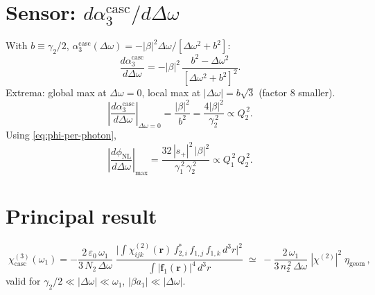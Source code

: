 \documentclass[11pt,a4paper]{article}
\newcommand{\eps}{\varepsilon}
\newcommand{\bvec}[1]{\mathbf{#1}}
\newcommand{\f}{\bvec{f}}
\newcommand{\ri}{\bvec{r}}
\newcommand{\dthreer}{\,d^{3}r}
\newcommand{\chitwo}{\chi^{(2)}}
\newcommand{\chithree}{\chi^{(3)}}
\newcommand{\Dom}{\Delta\omega}
\begin{document}
\section{Sensor: $d\alpha_3^\text{casc}/d\Dom$}

With $b\equiv\gamma_2/2$, $\alpha_3^\text{casc}(\Dom)=-|\beta|^{2}\Dom/[\Dom^{2}+b^{2}]$:
\begin{equation}
  \frac{d\alpha_3^\text{casc}}{d\Dom}=-|\beta|^{2}\,
        \frac{b^{2}-\Dom^{2}}{[\Dom^{2}+b^{2}]^{2}}.
\end{equation}
Extrema: global max at $\Dom=0$, local max at $|\Dom|=b\sqrt{3}$ (factor 8 smaller).
\begin{equation}
  \boxed{\;\left|\frac{d\alpha_3^\text{casc}}{d\Dom}\right|_{\Dom=0}
     =\frac{|\beta|^{2}}{b^{2}}=\frac{4|\beta|^{2}}{\gamma_2^{\,2}}\propto Q_2^{\,2}.\;}
\end{equation}
Using \eqref{eq:phi-per-photon},
\begin{equation}
   \left|\frac{d\phi_\text{NL}}{d\Dom}\right|_\text{max}
     =\frac{32\,|s_+|^{2}\,|\beta|^{2}}{\gamma_1^{\,2}\,\gamma_2^{\,2}}
     \propto Q_1^{\,2}\,Q_2^{\,2}.
\end{equation}

\section{Principal result}

\begin{equation}
  \boxed{\;\chithree_\text{casc}(\omega_1)
        =-\frac{2\,\eps_0\,\omega_1}{3\,N_2\,\Dom}\;
          \frac{\bigl|\!\int\!\chitwo_{ijk}(\ri)\,f_{2,i}^*\,f_{1,j}\,f_{1,k}\dthreer\bigr|^{2}}
               {\int|\f_1(\ri)|^{4}\dthreer}
        \;\simeq\;-\frac{2\,\omega_1}{3\,n_2^{\,2}\,\Dom}\;|\chitwo|^{2}\;\eta_\text{geom}\,,\;}
\end{equation}
valid for $\gamma_2/2\ll|\Dom|\ll\omega_1$, $|\beta a_1|\ll|\Dom|$.
\end{document}
